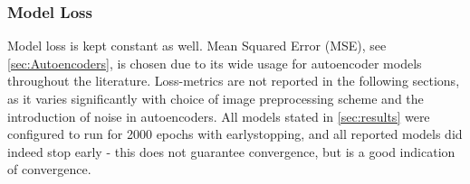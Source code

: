 \subsubsection{Model Loss}
Model loss is kept constant as well. Mean Squared Error (MSE), see \autoref{sec:Autoencoders}, is chosen due to its wide usage for autoencoder models throughout the literature.
Loss-metrics are not reported in the following sections, as it varies significantly with choice of image preprocessing scheme and the introduction of noise in autoencoders.
All models stated in \autoref{sec:results} were configured to run for 2000 epochs with earlystopping, and all reported models did indeed stop early - this does not guarantee convergence, but is a good indication of convergence.
